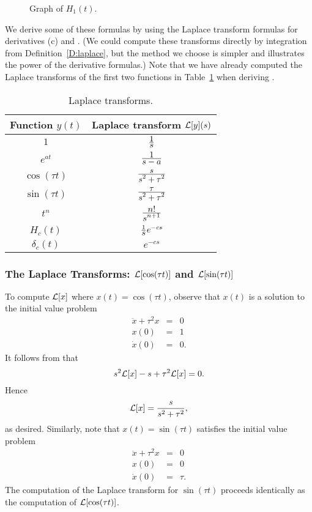 \begin{figure}[htb]
           \centerline{%
           }
           \caption{Graph of $H_1(t)$.}
           \label{F:H1}
\end{figure}

We derive some of these formulas by using the Laplace transform formulas for 
derivatives (c) and .  (We could compute these 
transforms directly by integration from Definition~\ref{D:laplace}, but the 
method we choose is simpler and illustrates the power of the derivative 
formulas.)  Note that we have already computed the Laplace transforms 
of the first two functions in Table~\ref{tab:Laplist} when deriving 
.

\begin{table}[htb]
\begin{center}
\begin{tabular}{|c|c|}
\hline
Function $y(t)$ & Laplace transform ${\cal L}[y](s)$\\
\hline
$1$ & $\frac{\displaystyle 1}{\displaystyle s}$\\
$e^{at}$ & $\frac{\displaystyle 1}{\displaystyle s-a}$\\
$\cos(\tau t)$ & $\frac{\displaystyle s}{\displaystyle s^2 + \tau^2}$\\
$\sin(\tau t)$ & $\frac{\displaystyle \tau}{\displaystyle s^2 + \tau^2}$\\
$t^n$ & $\frac{\displaystyle n!}{\displaystyle s^{n+1}}$\\
$H_c(t)$ & $\frac{1}{\displaystyle s}e^{-cs}$\\
$\delta_c(t)$ & $e^{-cs}$\\
\hline
\end{tabular}
\end{center}
\caption{Laplace transforms.}
\label{tab:Laplist}
\end{table}


\subsubsection*{The Laplace Transforms: ${\cal L}[\cos(\tau t)]$ and 
${\cal L}[\sin(\tau t)]$}

To compute ${\cal L}[x]$ where $x(t)=\cos(\tau t)$, observe that $x(t)$ is 
a solution to the initial value problem
\begin{eqnarray*}
\ddot{x}+\tau^2 x & = & 0\\ 
x(0) & = & 1 \\ 
\dot{x}(0) & = & 0.
\end{eqnarray*}
It follows from  that
\[
s^2{\cal L}[x] - s + \tau^2 {\cal L}[x] = 0.
\]
Hence
\[
{\cal L}[x] = \frac{s}{s^2+\tau^2},
\]
as desired.  Similarly, note that $x(t)=\sin(\tau t)$ satisfies the initial
value problem
\begin{eqnarray*}
\ddot{x}+\tau^2 x & = & 0 \\
  x(0) & = & 0 \\
 \dot{x}(0) & = & \tau.
\end{eqnarray*}
The computation of the Laplace transform for $\sin(\tau t)$ proceeds
identically as the computation of ${\cal L}[\cos(\tau t)]$.

